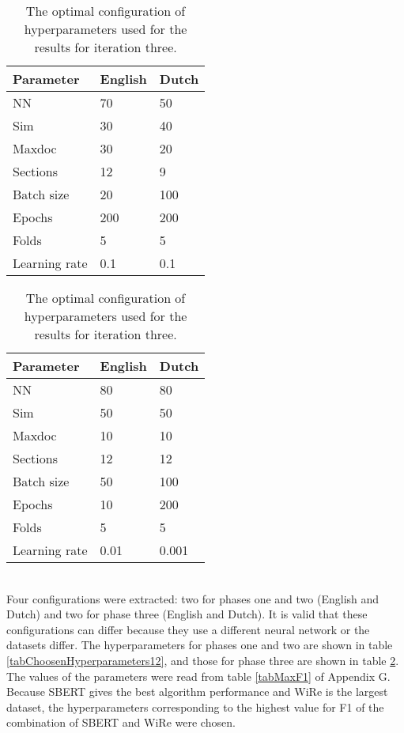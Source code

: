 {
\begin{table}[!ht]
	\parbox{.45\linewidth} {
    \centering
    \captionsetup{justification=centering}
    \begin{tabular}{l|l|l}
    \hline
        \textbf{Parameter} & \textbf{English} & \textbf{Dutch} \\ \hline
        NN & 70 & 50 \\ \hline
        Sim & 30 & 40\\ \hline
        Maxdoc & 30 & 20\\ \hline
        Sections & 12 & 9\\ \hline
        Batch size & 20 & 100 \\ \hline
        Epochs & 200 & 200\\ \hline
        Folds & 5 & 5\\ \hline
        Learning rate & 0.1 & 0.1\\ \hline
    \end{tabular}
    \caption{The optimal configuration of hyperparameters used for the results for iteration two.}
    \label{tabChoosenHyperparameters12}
    }
\parbox{.45\linewidth}{
\centering
    \centering
    \captionsetup{justification=centering}
    \begin{tabular}{l|l|l}
    \hline
        \textbf{Parameter} & \textbf{English} & \textbf{Dutch} \\ \hline
        NN & 80 & 80 \\ \hline
        Sim & 50 & 50\\ \hline
        Maxdoc & 10 & 10\\ \hline
        Sections & 12 & 12\\ \hline
        Batch size & 50 & 100 \\ \hline
        Epochs & 10 & 200\\ \hline
        Folds & 5 & 5\\ \hline
        Learning rate & 0.01 & 0.001\\ \hline
    \end{tabular}
    \caption{The optimal configuration of hyperparameters used for the results for iteration three.}
    \label{tabChoosenHyperparameters3}
    }
\end{table}
\\ 

Four configurations were extracted: two for phases one and two (English and Dutch) and two for phase three (English and Dutch). It is valid that these configurations can differ because they use a different neural network or the datasets differ. The hyperparameters for phases one and two are shown in table \ref{tabChoosenHyperparameters12}, and those for phase three are shown in table \ref{tabChoosenHyperparameters3}. The values of the parameters were read from table \ref{tabMaxF1} of Appendix G. Because SBERT gives the best algorithm performance and WiRe is the largest dataset, the hyperparameters corresponding to the highest value for F1 of the combination of SBERT and WiRe were chosen.\\

}
